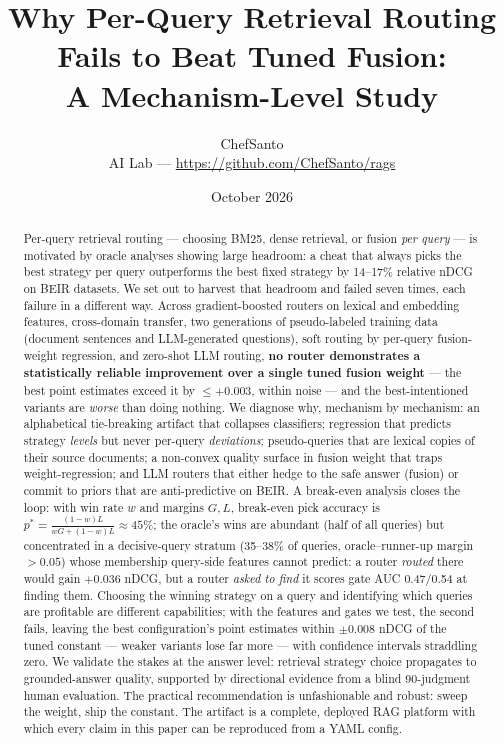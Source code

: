 \documentclass[11pt]{article}
\title{Why Per-Query Retrieval Routing Fails to Beat Tuned Fusion:\\A Mechanism-Level Study}
\author{ChefSanto\\
  \small AI Lab --- \url{https://github.com/ChefSanto/rags}}
\date{October 2026}
\begin{document}
\maketitle

\begin{abstract}
Per-query retrieval routing --- choosing BM25, dense retrieval, or fusion \emph{per query} --- is motivated by oracle analyses showing large headroom: a cheat that always picks the best strategy per query outperforms the best fixed strategy by 14--17\% relative nDCG on BEIR datasets. We set out to harvest that headroom and failed seven times, each failure in a different way. Across gradient-boosted routers on lexical and embedding features, cross-domain transfer, two generations of pseudo-labeled training data (document sentences and LLM-generated questions), soft routing by per-query fusion-weight regression, and zero-shot LLM routing, \textbf{no router demonstrates a statistically reliable improvement over a single tuned fusion weight} --- the best point estimates exceed it by ${\le}{+}0.003$, within noise --- and the best-intentioned variants are \emph{worse} than doing nothing. We diagnose why, mechanism by mechanism: an alphabetical tie-breaking artifact that collapses classifiers; regression that predicts strategy \emph{levels} but never per-query \emph{deviations}; pseudo-queries that are lexical copies of their source documents; a non-convex quality surface in fusion weight that traps weight-regression; and LLM routers that either hedge to the safe answer (fusion) or commit to priors that are anti-predictive on BEIR. A break-even analysis closes the loop: with win rate $w$ and margins $G, L$, break-even pick accuracy is $p^* = \frac{(1-w)L}{wG + (1-w)L} \approx 45\%$; the oracle's wins are abundant (half of all queries) but concentrated in a decisive-query stratum (35--38\% of queries, oracle--runner-up margin $>0.05$) whose membership query-side features cannot predict: a router \emph{routed} there would gain $+0.036$ nDCG, but a router \emph{asked to find} it scores gate AUC 0.47/0.54 at finding them. Choosing the winning strategy on a query and identifying which queries are profitable are different capabilities; with the features and gates we test, the second fails, leaving the best configuration's point estimates within $\pm 0.008$ nDCG of the tuned constant --- weaker variants lose far more --- with confidence intervals straddling zero. We validate the stakes at the answer level: retrieval strategy choice propagates to grounded-answer quality, supported by directional evidence from a blind 90-judgment human evaluation. The practical recommendation is unfashionable and robust: sweep the weight, ship the constant. The artifact is a complete, deployed RAG platform with which every claim in this paper can be reproduced from a YAML config.
\end{abstract}
\end{document}
